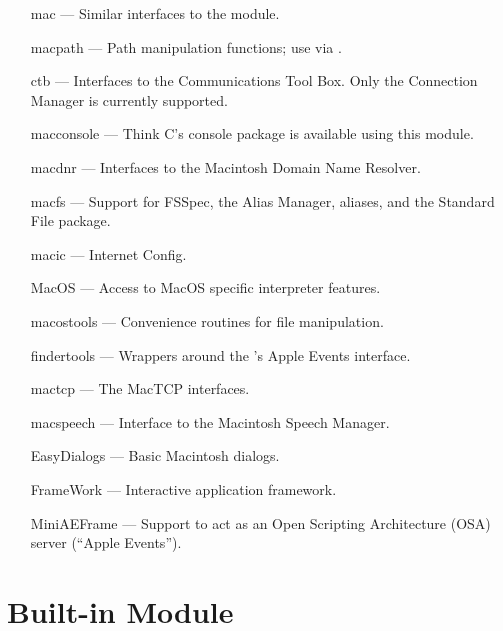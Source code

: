 \begin{itemize}

\item[mac]
--- Similar interfaces to the  module.

\item[macpath]
--- Path manipulation functions; use via .

\item[ctb]
--- Interfaces to the Communications Tool Box.  Only the Connection
Manager is currently supported.

\item[macconsole]
--- Think C's console package is available using this module.

\item[macdnr]
--- Interfaces to the Macintosh Domain Name Resolver.

\item[macfs]
--- Support for FSSpec, the Alias Manager,  aliases,
and the Standard File package.

\item[macic]
--- Internet Config.

\item[MacOS]
--- Access to MacOS specific interpreter features.

\item[macostools]
--- Convenience routines for file manipulation.

\item[findertools]
--- Wrappers around the 's Apple Events interface.

\item[mactcp]
--- The MacTCP interfaces.

\item[macspeech]
--- Interface to the Macintosh Speech Manager.

\item[EasyDialogs]
--- Basic Macintosh dialogs.

\item[FrameWork]
--- Interactive application framework.

\item[MiniAEFrame]
--- Support to act as an Open Scripting Architecture (OSA) server
(``Apple Events'').

\end{itemize}


\section{Built-in Module }
\label{module-mac}

